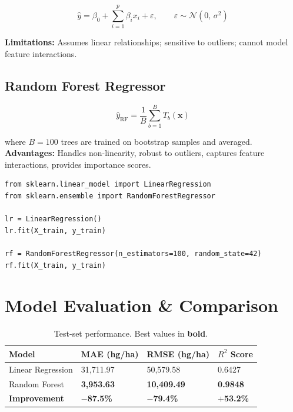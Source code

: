 \documentclass[12pt,a4paper]{article}
\begin{document}
\begin{equation}
  \hat{y} = \beta_0 + \sum_{i=1}^{p} \beta_i x_i + \varepsilon,
  \qquad \varepsilon \sim \mathcal{N}(0,\,\sigma^2)
\end{equation}

\textbf{Limitations:} Assumes linear relationships; sensitive to outliers;
cannot model feature interactions.

\subsection{Random Forest Regressor}

\begin{equation}
  \hat{y}_{\mathrm{RF}} = \frac{1}{B}\sum_{b=1}^{B} T_b(\mathbf{x})
\end{equation}

where $B=100$ trees are trained on bootstrap samples and averaged.
\textbf{Advantages:} Handles non-linearity, robust to outliers, captures
feature interactions, provides importance scores.

\begin{lstlisting}[caption={Training both models.}]
from sklearn.linear_model import LinearRegression
from sklearn.ensemble import RandomForestRegressor

lr = LinearRegression()
lr.fit(X_train, y_train)

rf = RandomForestRegressor(n_estimators=100, random_state=42)
rf.fit(X_train, y_train)
\end{lstlisting}

\section{Model Evaluation \& Comparison}

\begin{table}[H]
\centering
\caption{Test-set performance. Best values in \textbf{bold}.}
\label{tab:results}
\renewcommand{\arraystretch}{1.5}
\begin{tabularx}{\textwidth}{L{4.2cm} C{3cm} C{3cm} C{2.5cm}}
\toprule
{}
\color{white}\textbf{Model} &
\color{white}\textbf{MAE (hg/ha)} &
\color{white}\textbf{RMSE (hg/ha)} &
\color{white}\textbf{$R^2$ Score} \\
\midrule
Linear Regression    & 31,711.97         & 50,579.58          & 0.6427 \\
Random Forest        & \textbf{3,953.63} & \textbf{10,409.49} & \textbf{0.9848} \\
\midrule
{}
\color{sgreen}\textbf{Improvement} &
\color{sgreen}\centering\textbf{$-$87.5\%} &
\color{sgreen}\centering\textbf{$-$79.4\%} &
\color{sgreen}\centering\arraybackslash\textbf{$+$53.2\%} \\
\bottomrule
\end{tabularx}
\end{table}
\end{document}
